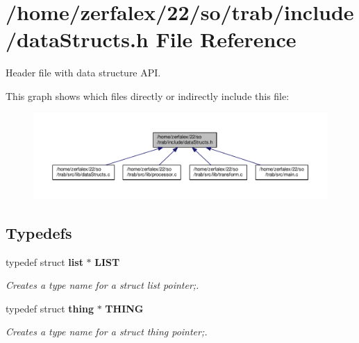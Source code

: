 \section{/home/zerfalex/22/so/trab/include/data\+Structs.h File Reference}
\label{data_structs_8h}


Header file with data structure A\+PI.  


This graph shows which files directly or indirectly include this file\+:\nopagebreak
\begin{figure}[H]
\begin{center}
\leavevmode
\includegraphics[width=350pt]{data_structs_8h__dep__incl}
\end{center}
\end{figure}
\subsection*{Typedefs}
\begin{DoxyCompactItemize}
\item 
typedef struct {\bf list} $\ast$ {\bf L\+I\+ST}
\begin{DoxyCompactList}\small\item\em Creates a type name for a struct list pointer;. \end{DoxyCompactList}\item 
typedef struct {\bf thing} $\ast$ {\bf T\+H\+I\+NG}
\begin{DoxyCompactList}\small\item\em Creates a type name for a struct thing pointer;. \end{DoxyCompactList}\end{DoxyCompactItemize}
